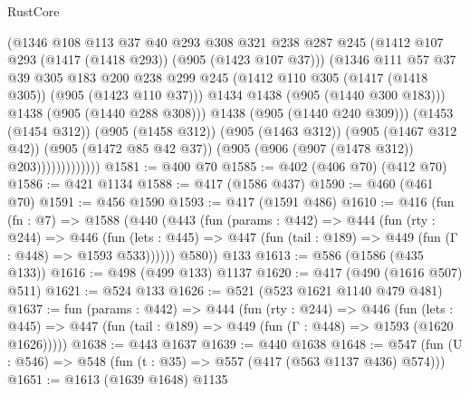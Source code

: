 \begin{lexlean}{RustCore}
\begin{coremodule}
                            (@1346
                              @108
                              @113
                              @37
                              @40
                              @293
                              @308
                              @321
                              @238
                              @287
                              @245
                              (@1412 @107 @293 (@1417 (@1418 @293)) (@905 (@1423 @107 @37)))
                              (@1346
                                @111
                                @57
                                @37
                                @39
                                @305
                                @183
                                @200
                                @238
                                @299
                                @245
                                (@1412 @110 @305 (@1417 (@1418 @305)) (@905 (@1423 @110 @37)))
                                @1434
                                @1438
                                (@905 (@1440 @300 @183)))
                              @1438
                              (@905 (@1440 @288 @308)))
                            @1438
                            (@905 (@1440 @240 @309)))
                          (@1453 (@1454 @312))
                          (@905 (@1458 @312))
                          (@905 (@1463 @312))
                          (@905 (@1467 @312 @42))
                          (@905 (@1472 @85 @42 @37))
                          (@905 (@906 (@907 (@1478 @312)) @203)))))))))))))
@1581 := @400 @70
@1585 := @402 (@406 @70) (@412 @70)
@1586 := @421 @1134
@1588 := @417 (@1586 @437)
@1590 := @460 (@461 @70)
@1591 := @456 @1590
@1593 := @417 (@1591 @486)
@1610 := @416
    (fun (fn : @7) =>
    @1588
      (@440
        (@443
          (fun (params : @442) =>
          @444
            (fun (rty : @244) =>
            @446
              (fun (lets : @445) =>
              @447 (fun (tail : @189) => @449 (fun (Γ : @448) => @1593 @533))))))
        @580))
    @133
@1613 := @586 (@1586 (@435 @133))
@1616 := @498 (@499 @133) @1137
@1620 := @417 (@490 (@1616 @507) @511)
@1621 := @524 @133
@1626 := @521 (@523 @1621 @1140 @479 @481)
@1637 := fun (params : @442) =>
  @444
    (fun (rty : @244) =>
    @446
      (fun (lets : @445) =>
      @447 (fun (tail : @189) => @449 (fun (Γ : @448) => @1593 (@1620 @1626)))))
@1638 := @443 @1637
@1639 := @440 @1638
@1648 := @547 (fun (U : @546) => @548 (fun (t : @35) => @557 (@417 (@563 @1137 @436) @574)))
@1651 := @1613 (@1639 @1648) @1135

\end{coremodule}
\end{lexlean}
